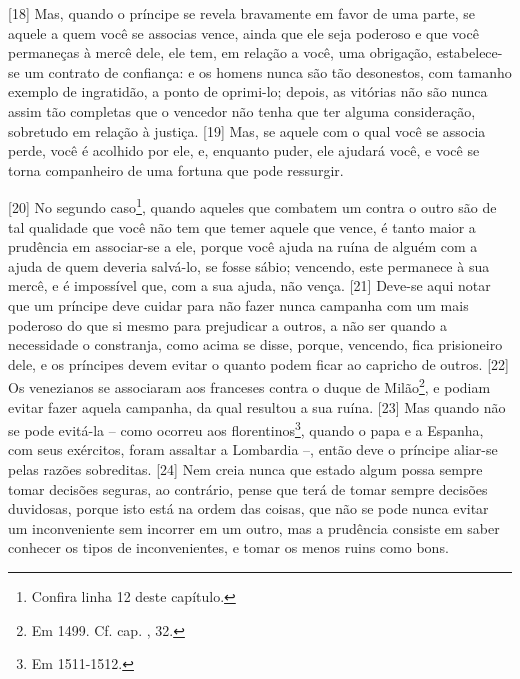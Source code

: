 {[}18{]} Mas, quando o príncipe se revela bravamente em favor de uma
parte, se aquele a quem você se associas vence, ainda que ele seja
poderoso e que você permaneças à mercê dele, ele tem, em relação a você,
uma obrigação, estabelece-se um contrato de confiança: e os homens nunca
são tão desonestos, com tamanho exemplo de ingratidão, a ponto de
oprimi-lo; depois, as vitórias não são nunca assim tão completas que o
vencedor não tenha que ter alguma consideração, sobretudo em relação à
justiça. {[}19{]} Mas, se aquele com o qual você se associa perde, você
é acolhido por ele, e, enquanto puder, ele ajudará você, e você se torna
companheiro de uma fortuna que pode ressurgir.

{[}20{]} No segundo caso\footnote{Confira linha 12 deste capítulo.},
quando aqueles que combatem um contra o outro são de tal qualidade que
você não tem que temer aquele que vence, é tanto maior a prudência em
associar-se a ele, porque você ajuda na ruína de alguém com a ajuda de
quem deveria salvá-lo, se fosse sábio; vencendo, este permanece à sua
mercê, e é impossível que, com a sua ajuda, não vença. {[}21{]} Deve-se
aqui notar que um príncipe deve cuidar para não fazer nunca campanha com
um mais poderoso do que si mesmo para prejudicar a outros, a não ser
quando a necessidade o constranja, como acima se disse, porque,
vencendo, fica prisioneiro dele, e os príncipes devem evitar o quanto
podem ficar ao capricho de outros. {[}22{]} Os venezianos se associaram
aos franceses contra o duque de Milão\footnote{Em 1499. Cf. cap. ,
  32.}, e podiam evitar fazer aquela campanha, da qual resultou a sua
ruína. {[}23{]} Mas quando não se pode evitá-la -- como ocorreu aos
florentinos\footnote{Em 1511-1512.}, quando o papa e a Espanha, com seus
exércitos, foram assaltar a Lombardia --, então deve o príncipe aliar-se
pelas razões sobreditas. {[}24{]} Nem creia nunca que estado algum possa
sempre tomar decisões seguras, ao contrário, pense que terá de tomar
sempre decisões duvidosas, porque isto está na ordem das coisas, que não
se pode nunca evitar um inconveniente sem incorrer em um outro, mas a
prudência consiste em saber conhecer os tipos de inconvenientes, e tomar
os menos ruins como bons.

